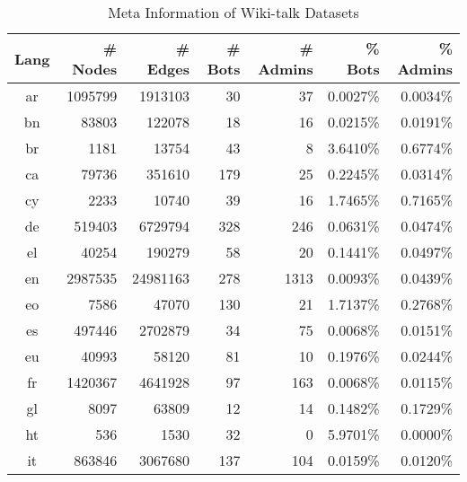 \documentclass[a4paper]{article}
\begin{document}
\vfill


 

\vspace{30px}

\newpage

\begin{appendix}
\begin{table}[H]
\centering
\caption{Meta Information of Wiki-talk Datasets}
\label{tab:metainfo-wikitalk}
\vspace{5px}
\begin{tabular}{c|r|r|r|r|r|r}
\toprule
\textbf{Lang} & \textbf{\# Nodes} & \textbf{\# Edges} & \textbf{\# Bots} & \textbf{\# Admins} & \textbf{\% Bots} & \textbf{\% Admins} \\
\midrule
    ar&   1095799&   1913103&          30&         37&      0.0027\% &   0.0034\% \\
    bn&     83803&    122078&          18&         16&      0.0215\% &   0.0191\% \\
    br&      1181&     13754&          43&          8&      3.6410\% &   0.6774\% \\
    ca&     79736&    351610&         179&         25&      0.2245\% &   0.0314\% \\
    cy&      2233&     10740&          39&         16&      1.7465\% &   0.7165\% \\
    de&    519403&   6729794&         328&        246&      0.0631\% &   0.0474\% \\
    el&     40254&    190279&          58&         20&      0.1441\% &   0.0497\% \\
    en&   2987535&  24981163&         278&       1313&      0.0093\% &   0.0439\% \\
    eo&      7586&     47070&         130&         21&      1.7137\% &   0.2768\% \\
    es&    497446&   2702879&          34&         75&      0.0068\% &   0.0151\% \\
    eu&     40993&     58120&          81&         10&      0.1976\% &   0.0244\% \\
    fr&   1420367&   4641928&          97&        163&      0.0068\% &   0.0115\% \\
    gl&      8097&     63809&          12&         14&      0.1482\% &   0.1729\% \\
    ht&       536&      1530&          32&          0&      5.9701\% &   0.0000\% \\
    it&    863846&   3067680&         137&        104&      0.0159\% &   0.0120\% \\

\end{tabular}
\end{table}
\end{appendix}
\end{document}
